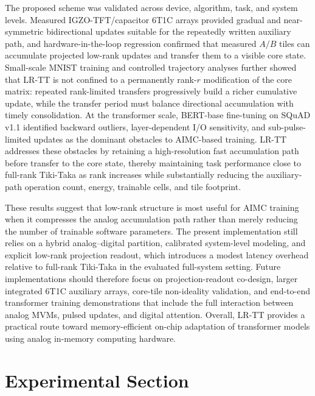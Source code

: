 \documentclass[AMA,LATO2COL]{WileyNJDv5}
\begin{document}
The proposed scheme was validated across device, algorithm, task, and system levels. Measured IGZO-TFT/capacitor 6T1C arrays provided gradual and near-symmetric bidirectional updates suitable for the repeatedly written auxiliary path, and hardware-in-the-loop regression confirmed that measured \(A/B\) tiles can accumulate projected low-rank updates and transfer them to a visible core state. Small-scale MNIST training and controlled trajectory analyses further showed that LR-TT is not confined to a permanently rank-\(r\) modification of the core matrix: repeated rank-limited transfers progressively build a richer cumulative update, while the transfer period must balance directional accumulation with timely consolidation. At the transformer scale, BERT-base fine-tuning on SQuAD v1.1 identified backward outliers, layer-dependent I/O sensitivity, and sub-pulse-limited updates as the dominant obstacles to AIMC-based training. LR-TT addresses these obstacles by retaining a high-resolution fast accumulation path before transfer to the core state, thereby maintaining task performance close to full-rank Tiki-Taka as rank increases while substantially reducing the auxiliary-path operation count, energy, trainable cells, and tile footprint.

These results suggest that low-rank structure is most useful for AIMC training when it compresses the analog accumulation path rather than merely reducing the number of trainable software parameters. The present implementation still relies on a hybrid analog--digital partition, calibrated system-level modeling, and explicit low-rank projection readout, which introduces a modest latency overhead relative to full-rank Tiki-Taka in the evaluated full-system setting. Future implementations should therefore focus on projection-readout co-design, larger integrated 6T1C auxiliary arrays, core-tile non-ideality validation, and end-to-end transformer training demonstrations that include the full interaction between analog MVMs, pulsed updates, and digital attention. Overall, LR-TT provides a practical route toward memory-efficient on-chip adaptation of transformer models using analog in-memory computing hardware.

\section{Experimental Section}
\label{sec:experimental}
\end{document}
